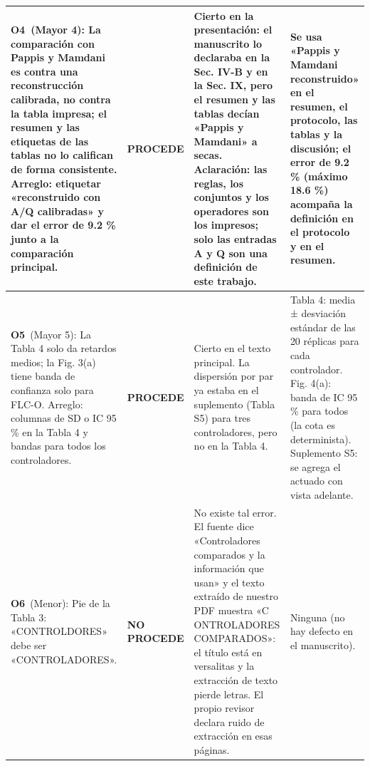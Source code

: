 \begin{longtable}{@{}p{7.4cm}p{2.1cm}p{8.4cm}p{7.3cm}@{}}
\textbf{O4}\ (Mayor 4): La comparación con Pappis y Mamdani es contra una reconstrucción calibrada, no contra la tabla impresa; el resumen y las etiquetas de las tablas no lo califican de forma consistente. Arreglo: etiquetar «reconstruido con A/Q calibradas» y dar el error de 9.2 \% junto a la comparación principal.\par\smallskip{\itshape Ubicaci\'on citada: Sec. IV-B; Sec. IX; Tabla 4; Abstract} & \cellcolor{okverde}\textbf{PROCEDE} & Cierto en la presentación: el manuscrito lo declaraba en la Sec. IV-B y en la Sec. IX, pero el resumen y las tablas decían «Pappis y Mamdani» a secas. Aclaración: las reglas, los conjuntos y los operadores son los impresos; solo las entradas A y Q son una definición de este trabajo. & Se usa «Pappis y Mamdani reconstruido» en el resumen, el protocolo, las tablas y la discusión; el error de 9.2 \% (máximo 18.6 \%) acompaña la definición en el protocolo y en el resumen.\par\smallskip{\itshape Queda en: Sec. IV-B (p. 3); Sec. VII (p. 7); Tabla 3 (p. 7); Tabla 4 (p. 9); Sec. IX (p. 8)} \\
\midrule
\textbf{O5}\ (Mayor 5): La Tabla 4 solo da retardos medios; la Fig. 3(a) tiene banda de confianza solo para FLC-O. Arreglo: columnas de SD o IC 95 \% en la Tabla 4 y bandas para todos los controladores.\par\smallskip{\itshape Ubicaci\'on citada: Tabla 4; Fig. 3; C7} & \cellcolor{okverde}\textbf{PROCEDE} & Cierto en el texto principal. La dispersión por par ya estaba en el suplemento (Tabla S5) para tres controladores, pero no en la Tabla 4. & Tabla 4: media ± desviación estándar de las 20 réplicas para cada controlador. Fig. 4(a): banda de IC 95 \% para todos (la cota es determinista). Suplemento S5: se agrega el actuado con vista adelante.\par\smallskip{\itshape Queda en: Tabla 4 (p. 9); Fig. 4 (p. 9); Tabla S5 del suplemento (p. 4)} \\
\midrule
\textbf{O6}\ (Menor): Pie de la Tabla 3: «CONTROLDORES» debe ser «CONTROLADORES».\par\smallskip{\itshape Ubicaci\'on citada: Tabla 3, pie} & \cellcolor{okrojo}\textbf{NO PROCEDE} & No existe tal error. El fuente dice «Controladores comparados y la información que usan» y el texto extraído de nuestro PDF muestra «C ONTROLADORES COMPARADOS»: el título está en versalitas y la extracción de texto pierde letras. El propio revisor declara ruido de extracción en esas páginas. & Ninguna (no hay defecto en el manuscrito).\par\smallskip{\itshape Queda en: Tabla 3 (p. 7)} \\

\end{longtable}

